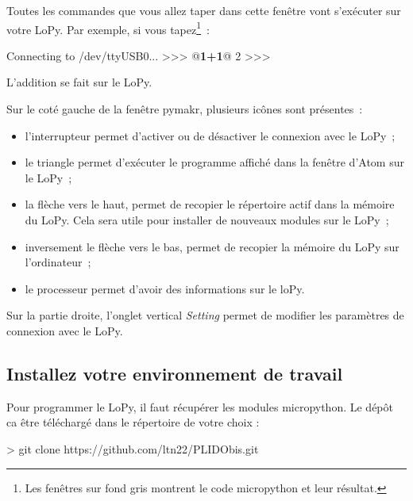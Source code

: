 Toutes les commandes que vous allez taper dans cette fenêtre vont s’exécuter sur votre LoPy. Par exemple, si vous tapez\footnote{Les fenêtres sur fond gris montrent le code micropython et leur résultat.}~:

\begin{termc}[backgroundcolor=\color{gray!10}, basicstyle=\ttfamily\small, escapechar=@]
Connecting to /dev/ttyUSB0...
>>> @\textbf{1+1}@
2
>>>
\end{termc}

L’addition se fait sur le LoPy.

     \vspace{1em}

Sur le coté gauche de la fenêtre pymakr, plusieurs icônes sont présentes~:
\begin{itemize}
    \item l'interrupteur permet d'activer ou de désactiver le connexion avec le LoPy~;
    \item le triangle permet d'exécuter le programme affiché dans la fenêtre d'Atom sur le LoPy~;
    \item la flèche vers le haut, permet de recopier le répertoire actif dans la mémoire du LoPy. Cela sera utile pour installer de nouveaux modules sur le LoPy~;
    \item inversement le flèche vers le bas, permet de recopier la mémoire du LoPy sur l'ordinateur~;
    \item le processeur permet d'avoir des informations sur le loPy.
\end{itemize}

     \vspace{1em}

Sur la partie droite, l'onglet vertical \textit{Setting} permet de modifier les paramètres de connexion avec le LoPy.

\subsection{Installez votre environnement de travail} 

Pour programmer le LoPy, il faut récupérer les modules micropython. Le dépôt ca être téléchargé dans le répertoire de votre choix :

\begin{termc}[backgroundcolor=\color{gray!10},  basicstyle=\ttfamily\small, escapechar=@]
> git clone https://github.com/ltn22/PLIDObis.git
\end{termc}

